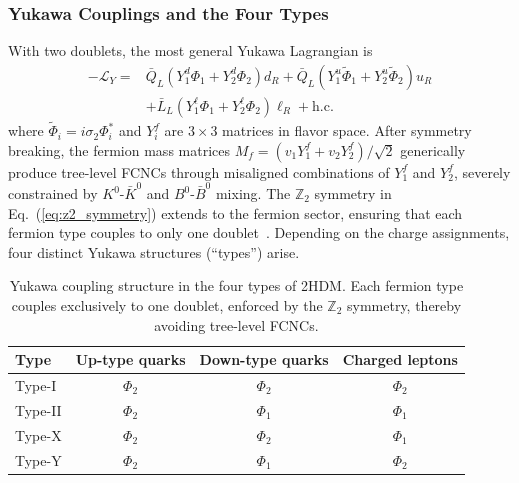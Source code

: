 \subsubsection{Yukawa Couplings and the Four Types}
\label{sec:2hdm_yukawa}

With two doublets, the most general Yukawa Lagrangian is~\cite{Branco:2011iw}
\begin{equation}
\begin{split}
-\mathcal{L}_Y = &\bar{Q}_L \left(Y_1^d \Phi_1 + Y_2^d \Phi_2\right) d_R + \bar{Q}_L \left(Y_1^u \widetilde{\Phi}_1 + Y_2^u \widetilde{\Phi}_2\right) u_R \\
&+ \bar{L}_L \left(Y_1^\ell \Phi_1 + Y_2^\ell \Phi_2\right) \ell_R + \text{h.c.}
\end{split}
\label{eq:yukawa_general}
\end{equation}
where $\widetilde{\Phi}_i = i\sigma_2 \Phi_i^*$ and $Y_i^f$ are $3\times3$ matrices in flavor space. After symmetry breaking, the fermion mass matrices $M_f = (v_1 Y_1^f + v_2 Y_2^f)/\sqrt{2}$ generically produce tree-level FCNCs through misaligned combinations of $Y_1^f$ and $Y_2^f$, severely constrained by $K^0$-$\bar{K}^0$ and $B^0$-$\bar{B}^0$ mixing. The $\mathbb{Z}_2$ symmetry in Eq.~(\ref{eq:z2_symmetry}) extends to the fermion sector, ensuring that each fermion type couples to only one doublet~\cite{Branco:2011iw,Gunion:1990dt}. Depending on the charge assignments, four distinct Yukawa structures (``types'') arise.

\begin{table}[htbp]
\centering
\caption{Yukawa coupling structure in the four types of 2HDM. Each fermion type couples exclusively to one doublet, enforced by the $\mathbb{Z}_2$ symmetry, thereby avoiding tree-level FCNCs.}
\label{tab:2hdm_types}
\small
\begin{tabular}{lccc}
\hline\hline
Type & Up-type quarks & Down-type quarks & Charged leptons \\
\hline
Type-I & $\Phi_2$ & $\Phi_2$ & $\Phi_2$ \\
Type-II & $\Phi_2$ & $\Phi_1$ & $\Phi_1$ \\
Type-X & $\Phi_2$ & $\Phi_2$ & $\Phi_1$ \\
Type-Y & $\Phi_2$ & $\Phi_1$ & $\Phi_2$ \\
\hline\hline
\end{tabular}
\end{table}

